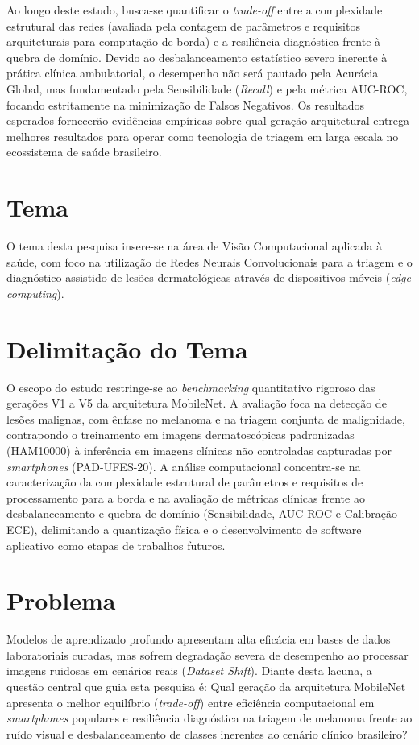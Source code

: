 \documentclass[oneside,english,brazilian]{UNISINOSmonografia}
\begin{document}
Ao longo deste estudo, busca-se quantificar o \textit{trade-off} entre a complexidade estrutural das redes (avaliada pela contagem de parâmetros e requisitos arquiteturais para computação de borda) e a resiliência diagnóstica frente à quebra de domínio. Devido ao desbalanceamento estatístico severo inerente à prática clínica ambulatorial, o desempenho não será pautado pela Acurácia Global, mas fundamentado pela Sensibilidade (\textit{Recall}) e pela métrica AUC-ROC, focando estritamente na minimização de Falsos Negativos. Os resultados esperados fornecerão evidências empíricas sobre qual geração arquitetural entrega melhores resultados para operar como tecnologia de triagem em larga escala no ecossistema de saúde brasileiro.

\section{Tema}
O tema desta pesquisa insere-se na área de Visão Computacional aplicada à saúde, com foco na utilização de Redes Neurais Convolucionais para a triagem e o diagnóstico assistido de lesões dermatológicas através de dispositivos móveis (\textit{edge computing}).

\section{Delimitação do Tema}
O escopo do estudo restringe-se ao \textit{benchmarking} quantitativo rigoroso das gerações V1 a V5 da arquitetura MobileNet. A avaliação foca na detecção de lesões malignas, com ênfase no melanoma e na triagem conjunta de malignidade, contrapondo o treinamento em imagens dermatoscópicas padronizadas (HAM10000) à inferência em imagens clínicas não controladas capturadas por \textit{smartphones} (PAD-UFES-20). A análise computacional concentra-se na caracterização da complexidade estrutural de parâmetros e requisitos de processamento para a borda e na avaliação de métricas clínicas frente ao desbalanceamento e quebra de domínio (Sensibilidade, AUC-ROC e Calibração ECE), delimitando a quantização física e o desenvolvimento de software aplicativo como etapas de trabalhos futuros.

\section{Problema}
Modelos de aprendizado profundo apresentam alta eficácia em bases de dados laboratoriais curadas, mas sofrem degradação severa de desempenho ao processar imagens ruidosas em cenários reais (\textit{Dataset Shift}). Diante desta lacuna, a questão central que guia esta pesquisa é: {Qual geração da arquitetura MobileNet apresenta o melhor equilíbrio (\textit{trade-off}) entre eficiência computacional em \textit{smartphones} populares e resiliência diagnóstica na triagem de melanoma frente ao ruído visual e desbalanceamento de classes inerentes ao cenário clínico brasileiro?}
\end{document}
